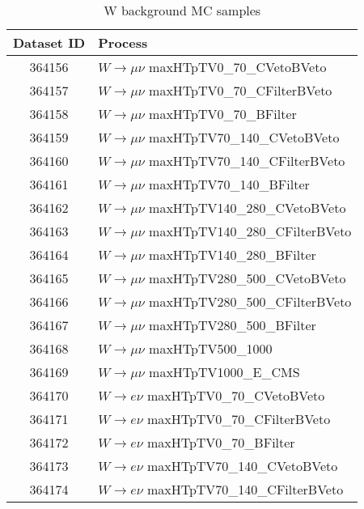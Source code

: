 \documentclass[14pt, a4paper]{book}
\begin{document}
\begin{table}[!h]
    \centering
    \caption{W background MC samples}
    \begin{tabular}{c|l}\midrule\midrule
        Dataset ID              & Process\\\midrule
        364156                  & $W\rightarrow \mu\nu$ maxHTpTV0\_70\_CVetoBVeto\\ 
        364157                  & $W\rightarrow \mu\nu$ maxHTpTV0\_70\_CFilterBVeto\\
        364158                  & $W\rightarrow \mu\nu$ maxHTpTV0\_70\_BFilter\\
        364159                  & $W\rightarrow \mu\nu$ maxHTpTV70\_140\_CVetoBVeto\\
        364160                  & $W\rightarrow \mu\nu$ maxHTpTV70\_140\_CFilterBVeto\\ 
        364161                  & $W\rightarrow \mu\nu$ maxHTpTV70\_140\_BFilter\\
        364162                  & $W\rightarrow \mu\nu$ maxHTpTV140\_280\_CVetoBVeto\\
        364163                  & $W\rightarrow \mu\nu$ maxHTpTV140\_280\_CFilterBVeto\\
        364164                  & $W\rightarrow \mu\nu$ maxHTpTV140\_280\_BFilter\\
        364165                  & $W\rightarrow \mu\nu$ maxHTpTV280\_500\_CVetoBVeto\\
        364166                  & $W\rightarrow \mu\nu$ maxHTpTV280\_500\_CFilterBVeto\\
        364167                  & $W\rightarrow \mu\nu$ maxHTpTV280\_500\_BFilter\\
        364168                  & $W\rightarrow \mu\nu$ maxHTpTV500\_1000\\
        364169                  & $W\rightarrow \mu\nu$ maxHTpTV1000\_E\_CMS\\
        364170                  & $W\rightarrow e\nu$ maxHTpTV0\_70\_CVetoBVeto\\
        364171                  & $W\rightarrow e\nu$ maxHTpTV0\_70\_CFilterBVeto\\
        364172                  & $W\rightarrow e\nu$ maxHTpTV0\_70\_BFilter\\
        364173                  & $W\rightarrow e\nu$ maxHTpTV70\_140\_CVetoBVeto\\
        364174                  & $W\rightarrow e\nu$ maxHTpTV70\_140\_CFilterBVeto\\

\end{tabular}
\end{table}
\end{document}
